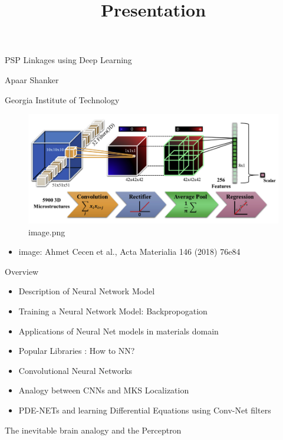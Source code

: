 \documentclass[11pt]{article}
\title{Presentation}
\makeatletter
\def\maxwidth{\ifdim\Gin@nat@width>\linewidth\linewidth
    \else\Gin@nat@width\fi}
\let\Oldincludegraphics\includegraphics
\renewcommand{\includegraphics}[1]{\Oldincludegraphics[width=.8\maxwidth]{#1}}
\providecommand{\tightlist}{%
      \setlength{\itemsep}{0pt}\setlength{\parskip}{0pt}}
\makeatother
\begin{document}
    
    
    \maketitle
    
    

    
    PSP Linkages using Deep Learning

Apaar Shanker

Georgia Institute of Technology

\begin{figure}
\centering
\includegraphics{pres_imgs/intro_slide.png}
\caption{image.png}
\end{figure}

\begin{itemize}
\tightlist
\item
  image: Ahmet Cecen et al., Acta Materialia 146 (2018) 76e84
\end{itemize}

    Overview

\begin{itemize}
\tightlist
\item
  Description of Neural Network Model
\item
  Training a Neural Network Model: Backpropogation
\item
  Applications of Neural Net models in materials domain
\item
  Popular Libraries : How to NN?
\item
  Convolutional Neural Networks
\item
  Analogy between CNNs and MKS Localization
\item
  PDE-NETs and learning Differential Equations using Conv-Net filters
\end{itemize}

    The inevitable brain analogy and the Perceptron
\end{document}

